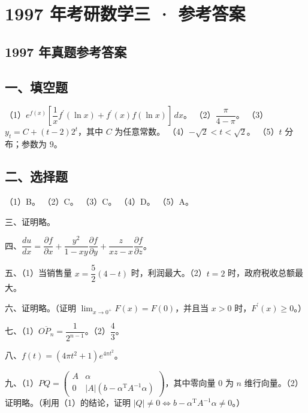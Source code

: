 \documentclass[UTF8,12pt]{ctexart}
\begin{document}
\section*{1997 年考研数学三 · 参考答案}
\subsection*{1997 年真题参考答案}

\subsection*{一、填空题}

（1）\(\displaystyle e^{f(x)}\left[\dfrac{\displaystyle 1}{\displaystyle x} f^{\prime}(\ln x)+f^{\prime}(x)f(\ln x)\right]\,dx\)。 （2）\(\displaystyle \dfrac{\displaystyle \pi}{\displaystyle 4-\pi}\)。 （3）\(\displaystyle y_t=C+(t-2)2^t\)，其中 \(\displaystyle C\) 为任意常数。 （4）\(\displaystyle -\sqrt2<t<\sqrt2\)。 （5）\(\displaystyle t\) 分布；参数为 \(\displaystyle 9\)。


\subsection*{二、选择题}

（1）B。 （2）C。 （3）C。 （4）D。 （5）A。


三、证明略。


四、\(\displaystyle \dfrac{\displaystyle du}{\displaystyle dx}=\dfrac{\displaystyle \partial f}{\displaystyle \partial x}+\dfrac{\displaystyle y^2}{\displaystyle 1-xy}\dfrac{\displaystyle \partial f}{\displaystyle \partial y}+\dfrac{\displaystyle z}{\displaystyle xz-x}\dfrac{\displaystyle \partial f}{\displaystyle \partial z}\)。


五、（1）当销售量 \(\displaystyle x=\dfrac{\displaystyle 5}{\displaystyle 2}(4-t)\) 时，利润最大。（2）\(\displaystyle t=2\) 时，政府税收总额最大。


六、证明略。（证明 \(\displaystyle \lim_{x\to0^+}F(x)=F(0)\)，并且当 \(\displaystyle x>0\) 时，\(\displaystyle F^{\prime}(x)\geq0\)。）


七、（1）\(\displaystyle \overline{OP_n}=\dfrac{\displaystyle 1}{\displaystyle 2^{n-1}}\)。（2）\(\displaystyle \dfrac{\displaystyle 4}{\displaystyle 3}\)。


八、\(\displaystyle f(t)=(4\pi t^2+1)e^{4\pi t^2}\)。


九、（1）\(\displaystyle PQ=\begin{pmatrix}A&\alpha\\0&|A|(b-\alpha^{\mathrm T}A^{-1}\alpha)\end{pmatrix}\)，其中零向量 \(\displaystyle 0\) 为 \(\displaystyle n\) 维行向量。（2）证明略。（利用（1）的结论，证明 \(\displaystyle |Q|\ne0\iff b-\alpha^{\mathrm T}A^{-1}\alpha\ne0\)。）
\end{document}
